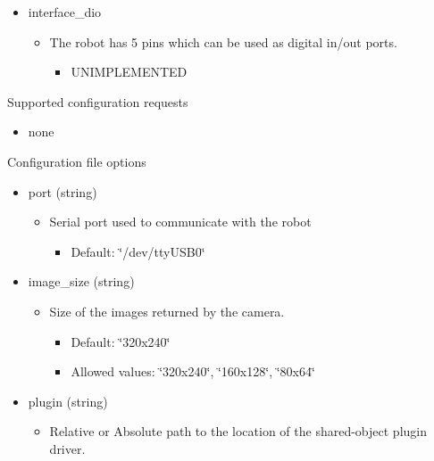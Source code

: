\begin{itemize}
\item interface\_\-dio\begin{itemize}
\item The robot has 5 pins which can be used as digital in/out ports.\begin{itemize}
\item UNIMPLEMENTED\end{itemize}
\end{itemize}
\end{itemize}


\begin{Desc}
\item[Supported configuration requests]\end{Desc}
\begin{itemize}
\item none\end{itemize}


\begin{Desc}
\item[Configuration file options]\end{Desc}
\begin{itemize}
\item port (string)\begin{itemize}
\item Serial port used to communicate with the robot\begin{itemize}
\item Default: \char`\"{}/dev/ttyUSB0\char`\"{}\end{itemize}
\end{itemize}
\item image\_\-size (string)\begin{itemize}
\item Size of the images returned by the camera.\begin{itemize}
\item Default: \char`\"{}320x240\char`\"{}\item Allowed values: \char`\"{}320x240\char`\"{}, \char`\"{}160x128\char`\"{}, \char`\"{}80x64\char`\"{}\end{itemize}
\end{itemize}
\item plugin (string)\begin{itemize}
\item Relative or Absolute path to the location of the shared-object plugin driver.\end{itemize}
\end{itemize}


